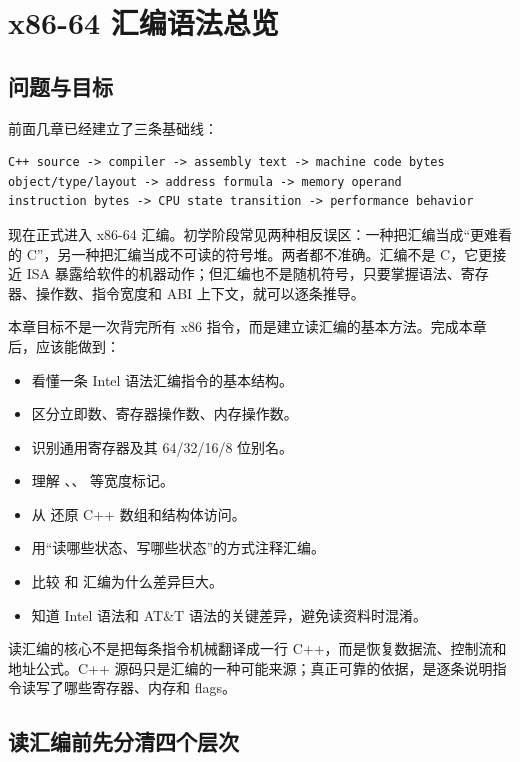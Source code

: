 \chapter{x86-64 汇编语法总览}

\section{问题与目标}

前面几章已经建立了三条基础线：

\begin{lstlisting}
C++ source -> compiler -> assembly text -> machine code bytes
object/type/layout -> address formula -> memory operand
instruction bytes -> CPU state transition -> performance behavior
\end{lstlisting}

现在正式进入 x86-64 汇编。初学阶段常见两种相反误区：一种把汇编当成“更难看的 C”，另一种把汇编当成不可读的符号堆。两者都不准确。汇编不是 C，它更接近 ISA 暴露给软件的机器动作；但汇编也不是随机符号，只要掌握语法、寄存器、操作数、指令宽度和 ABI 上下文，就可以逐条推导。

本章目标不是一次背完所有 x86 指令，而是建立读汇编的基本方法。完成本章后，应该能做到：

\begin{itemize}
  \item 看懂一条 Intel 语法汇编指令的基本结构。
  \item 区分立即数、寄存器操作数、内存操作数。
  \item 识别通用寄存器及其 64/32/16/8 位别名。
  \item 理解 、、 等宽度标记。
  \item 从  还原 C++ 数组和结构体访问。
  \item 用“读哪些状态、写哪些状态”的方式注释汇编。
  \item 比较  和  汇编为什么差异巨大。
  \item 知道 Intel 语法和 AT\&T 语法的关键差异，避免读资料时混淆。
\end{itemize}

\begin{keyidea}
读汇编的核心不是把每条指令机械翻译成一行 C++，而是恢复数据流、控制流和地址公式。C++ 源码只是汇编的一种可能来源；真正可靠的依据，是逐条说明指令读写了哪些寄存器、内存和 flags。
\end{keyidea}

\section{读汇编前先分清四个层次}

